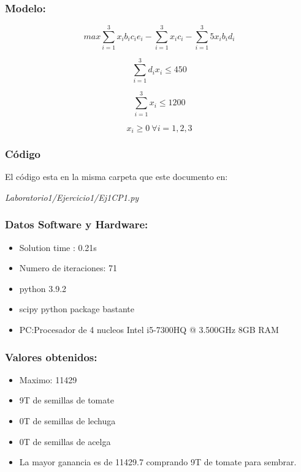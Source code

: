 \documentclass[]{article}
\begin{document}
  \subsubsection*{Modelo:} 

$$ max \sum_{i = 1}^3 x_i b_i c_i e_i - \sum_{i = 1}^3 x_i c_i - \sum_{i = 1}^3 5 x_i b_i d_i $$

$$ \sum_{i=1}^3 d_i x_i \leq 450$$

$$ \sum_{i=1}^3 x_i \leq 1200$$


$$ x_i \geq 0\ \forall i = 1, 2, 3$$

\subsubsection*{C\'odigo}

El c\'odigo esta en la misma carpeta que este documento en:

 \textit{ Laboratorio1/Ejercicio1/Ej1CP1.py}

\subsubsection*{Datos Software y Hardware:} 

\begin{itemize}


	 \item Solution time  :   0.21s
	 \item Numero de iteraciones: 71 
	 \item python 3.9.2  
	 \item scipy python package bastante 
	 \item PC:Procesador de 4 nucleos Intel i5-7300HQ @ 3.500GHz 8GB RAM
	

\end{itemize}

\subsubsection*{Valores obtenidos:} 


\begin{itemize}
	\item Maximo: 11429
	\item 9T de semillas de tomate
	\item 0T de semillas de lechuga
	\item 0T de semillas de acelga
	\item La mayor ganancia es de 11429.7 comprando 9T de tomate para sembrar.
\end{itemize}
\end{document}
